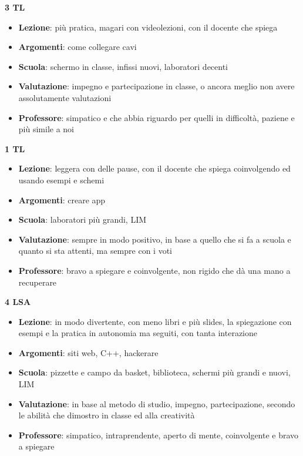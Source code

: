 \documentclass{article}
\begin{document}
	\begin{center}
	\textbf{3 TL}
	\end{center}
	\begin{itemize}
	\item \textbf{Lezione}: più pratica, magari con videolezioni, con il docente che spiega
	\item \textbf{Argomenti}: come collegare cavi
	\item \textbf{Scuola}: schermo in classe, infissi nuovi, laboratori decenti
	\item \textbf{Valutazione}: impegno e partecipazione in classe, o ancora meglio non avere assolutamente valutazioni
	\item \textbf{Professore}: simpatico e che abbia riguardo per quelli in difficoltà, paziene e più simile a noi
	\end{itemize}
	\begin{center}
	\newpage
	\textbf{1 TL}
	\end{center}
	\begin{itemize}
	\item \textbf{Lezione}: leggera con delle pause, con il docente che spiega coinvolgendo ed usando esempi e schemi
	\item \textbf{Argomenti}: creare app
	\item \textbf{Scuola}: laboratori più grandi, LIM
	\item \textbf{Valutazione}: sempre in modo positivo, in base a quello che si fa a scuola e quanto si sta attenti, ma sempre con i voti
	\item \textbf{Professore}: bravo a spiegare e coinvolgente, non rigido che dà una mano a recuperare
	\end{itemize}
	
	\begin{center}
	\textbf{4 LSA}
	\end{center}
	\begin{itemize}
	\item \textbf{Lezione}: in modo divertente, con meno libri e più slides, la spiegazione con esempi e la pratica in autonomia ma seguiti, con tanta interazione
	\item \textbf{Argomenti}: siti web, C++, hackerare
	\item \textbf{Scuola}: pizzette e campo da basket, biblioteca, schermi più grandi e nuovi, LIM
	\item \textbf{Valutazione}: in base al metodo di studio, impegno, partecipazione, secondo le abilità che dimostro in classe ed alla creatività
	\item \textbf{Professore}: simpatico, intraprendente, aperto di mente, coinvolgente e bravo a spiegare
	\end{itemize}
	
\end{document}
